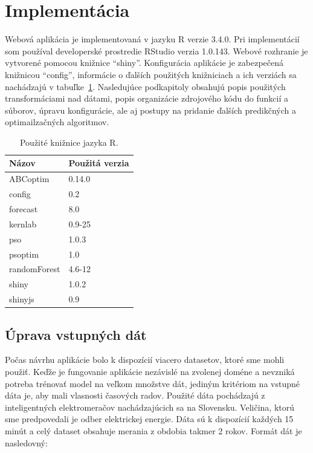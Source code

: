 \documentclass[a4paper,slovak,12pt,appendix]{article}
\begin{document}

\newpage
\section{Implementácia}
\label{implementation}
Webová aplikácia je implementovaná v jazyku R verzie 3.4.0. Pri implementácií
som používal developerské prostredie RStudio verzia 1.0.143. Webové rozhranie je
vytvorené pomocou knižnice ``shiny''. Konfigurácia aplikácie je zabezpečená
knižnicou ``config'', informácie o ďalších použitých knižniciach a ich verziách
sa nachádzajú v tabuľke~\ref{tab-libraries}. Nasledujúce podkapitoly obsahujú
popis použitých transformáciami nad dátami, popis organizácie zdrojového kódu
do funkcií a súborov, úpravu konfigurácie, ale aj postupy na pridanie ďalších
predikčných a optimailzačných algoritmov.

\begin{table}[ht]
  \centering
  \caption{Použité knižnice jazyka R.}
  \label{tab-libraries}
  \begin{tabular}{|l|l|}
    \hline
    \textbf{Názov}  &   \textbf{Použitá verzia}  \\ \hline
    ABCoptim        &   0.14.0  \\ \hline
    config          &   0.2     \\ \hline
    forecast        &   8.0     \\ \hline
    kernlab         &   0.9-25  \\ \hline
    pso             &   1.0.3   \\ \hline
    psoptim         &   1.0     \\ \hline
    randomForest    &   4.6-12  \\ \hline
    shiny           &   1.0.2   \\ \hline
    shinyjs         &   0.9     \\ \hline
  \end{tabular}
\end{table}


\subsection{Úprava vstupných dát}
Počas návrhu aplikácie bolo k dispozícií viacero datasetov, ktoré sme mohli
použiť. Keďže je fungovanie aplikácie nezávislé na zvolenej doméne a nevzniká
potreba trénovať model na veľkom množstve dát, jediným kritériom na vstupné
dáta je, aby mali vlasnosti časových radov. Použité dáta pochádzajú
z inteligentných elektromeračov nachádzajúcich sa na Slovensku. Veličina, ktorú
sme predpovedali je odber elektrickej energie. Dáta sú k dispozícií každých
15 minút a celý dataset obsahuje merania z obdobia takmer 2 rokov. Formát
dát je nasledovný:
\end{document}
